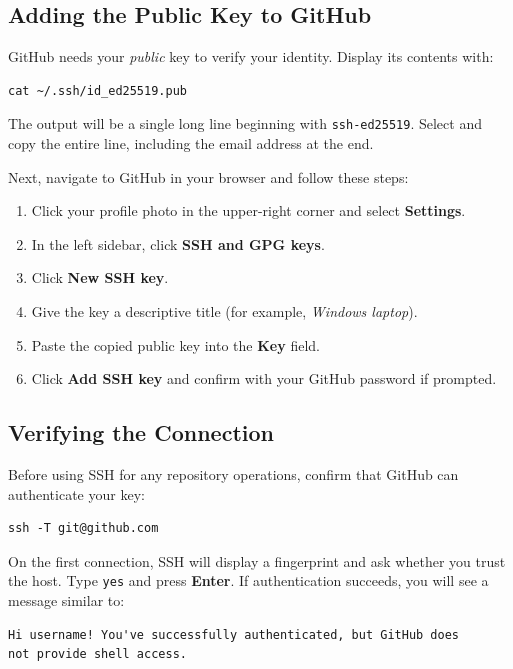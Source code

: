 \subsection{Adding the Public Key to GitHub}

GitHub needs your \emph{public} key to verify your identity. Display its contents with:

\begin{lstlisting}[style=bashstyle, caption={Display the public key}]
cat ~/.ssh/id_ed25519.pub
\end{lstlisting}

The output will be a single long line beginning with \texttt{ssh-ed25519}. Select and copy the entire line, including the email address at the end.

Next, navigate to GitHub in your browser and follow these steps:

\begin{enumerate}
    \item Click your profile photo in the upper-right corner and select \textbf{Settings}.
    \item In the left sidebar, click \textbf{SSH and GPG keys}.
    \item Click \textbf{New SSH key}.
    \item Give the key a descriptive title (for example, \textit{Windows laptop}).
    \item Paste the copied public key into the \textbf{Key} field.
    \item Click \textbf{Add SSH key} and confirm with your GitHub password if prompted.
\end{enumerate}

\subsection{Verifying the Connection}

Before using SSH for any repository operations, confirm that GitHub can authenticate your key:

\begin{lstlisting}[style=bashstyle, caption={Test the SSH connection to GitHub}]
ssh -T git@github.com
\end{lstlisting}

On the first connection, SSH will display a fingerprint and ask whether you trust the host. Type \texttt{yes} and press \textbf{Enter}. If authentication succeeds, you will see a message similar to:

\begin{lstlisting}[style=inlineStyle, caption={Expected response from GitHub}]
Hi username! You've successfully authenticated, but GitHub does
not provide shell access.
\end{lstlisting}

